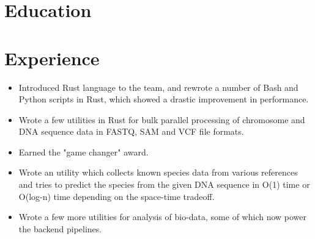 \documentclass[11pt,a4paper,sans]{moderncv}        %
\begin{document}


\vspace*{-1.8\baselineskip}
\makecvtitle
\vspace{-1.75\baselineskip}

\section{Education}


\section{Experience}
{\begin{itemize}
\item Introduced Rust language to the team, and rewrote a number of Bash and Python scripts in Rust, which showed a drastic improvement in performance.
\item Wrote a few utilities in Rust for bulk parallel processing of chromosome and DNA sequence data in FASTQ, SAM and VCF file formats.
\item Earned the "game changer" award.
\end{itemize}}
{\begin{itemize}
\item Wrote an utility which collects known species data from various references and tries to predict the species from the given DNA sequence in O(1) time or O(log-n) time depending on the space-time tradeoff.
\item Wrote a few more utilities for analysis of bio-data, some of which now power the backend pipelines.
\end{itemize}}
\end{document}
